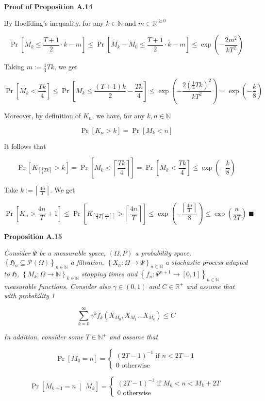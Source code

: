 \documentclass[a4paper]{article}
\newcommand{\Co}[1]{}
\newcommand{\AP}[1]{\left(#1\right)}
\newcommand{\AB}[1]{\left[#1\right]}
\newcommand{\AC}[1]{\left\{#1\right\}}
\newcommand{\ABM}[2]{\left[#1\;\middle\vert\;#2\right]}
\newcommand{\Ceil}[1]{\left\lceil #1 \right\rceil}
\newcommand{\Pa}[2]{\underset{#1}{\operatorname{Pr}}\AB{#2}}
\newcommand{\CP}[3]{\underset{#1}{\operatorname{Pr}}\ABM{#2}{#3}}
\newcommand{\Nats}{\mathbb{N}}
\newcommand{\Reals}{\mathbb{R}}
\newcommand{\PS}[1]{\mathcal{P}\AP{#1}} %
\newcommand{\Fi}{\mathfrak{H}}
\begin{document}

\textbf{Proof of Proposition A.14}\Co{b}

By Hoeffding's inequality, for any $k\in\Nats$ and $m\in\Reals^{\geq0}$

$$\Pa{}{M_k\leq \frac{T+1}{2}\cdot k-m}\leq\Pa{}{M_k-M_0\leq\frac{T+1}{2}\cdot k-m}\leq\exp\AP{-\frac{2m^2}{kT^2}}$$

Taking $m:=\frac{1}{4}Tk$, we get

$$\Pa{}{M_k< \frac{Tk}{4}}\leq\Pa{}{M_k\leq \frac{\AP{T+1}k}{2}-\frac{Tk}{4}}\leq\exp\AP{-\frac{2\AP{\frac{1}{4}Tk}^2}{kT^2}}=\exp\AP{-\frac{k}{8}}$$

Moreover, by definition of $K_n$, we have, for any $k,n\in\Nats$

$$\Pa{}{K_n> k}=\Pa{}{M_k< n}$$

It follows that

$$\Pa{}{K_{\Ceil{\frac{1}{4}Tk}}>k}=\Pa{}{M_k< \Ceil{\frac{Tk}{4}}}=\Pa{}{M_k<\frac{Tk}{4}}\leq\exp\AP{-\frac{k}{8}}$$

Take $k:=\Ceil{\frac{4n}{T}}$. We get

$$\Pa{}{K_n>\frac{4n}{T}+1}\leq\Pa{}{K_{\Ceil{\frac{1}{4}T\Ceil{\frac{4n}{T}}}}>\Ceil{\frac{4n}{T}}}\leq\exp\AP{-\frac{\Ceil{\frac{4n}{T}}}{8}}\leq\exp\AP{\frac{n}{2T}}\ \blacksquare$$

\textbf{Proposition A.15}\Co{b}

\textit{Consider $\Psi$ be a measurable space, $(\Omega,P)$ a probability space, $\AC{\Fi_n\subseteq\PS{\Omega}}_{n\in\Nats}$ a filtration, $\AC{X_n:\Omega\rightarrow\Psi}_{n\in\Nats}$ a stochastic process adapted to $\Fi$, $\AC{M_k:\Omega\rightarrow\Nats}_{k\in\Nats}$ stopping times and $\AC{f_n:\Psi^{n+1}\rightarrow[0,1]}_{n\in\Nats}$ measurable functions. Consider also $\gamma\in(0,1)$ and $C\in\Reals^+$ and assume that with probability 1}\Co{i}

$$\sum_{k=0}^\infty \gamma^kf_k\AP{X_{M_0},X_{M_1}\ldots X_{M_{k}}} \leq C$$

\textit{In addition, consider some $T\in\Nats^+$ and assume that}\Co{i}

$$\Pa{}{M_0=n}=\begin{cases} \AP{2T-1}^{-1} \text{ if } n < 2T-1\\ 0 \text{ otherwise} \end{cases}$$

$$\CP{}{M_{k+1}=n}{M_k}=\begin{cases} \AP{2T-1}^{-1} \text{ if } M_k < n < M_k+2T\\ 0 \text{ otherwise} \end{cases}$$
\end{document}
